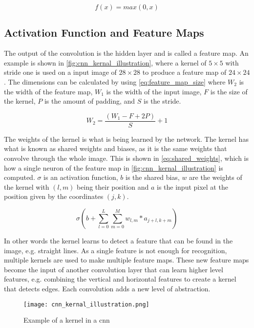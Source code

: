 \begin{equation}
\label{eq:ReluFunction}
f(x) = max(0,x)
\end{equation}

\subsection{Activation Function and Feature Maps}
The output of the convolution is the hidden layer and is called a feature map. An example is shown in \autoref{fig:cnn_kernal_illustration}, where a kernel of $5\times5$ with stride one is used on a input image of $28\times28$ to produce a feature map of $24\times24$. The dimensions can be calculated by using \autoref{eq:feature_map_size}  where $W_2$ is the width of the feature map, $W_1$ is the width of the input image, $F$ is the size of the kernel, $P$ is the amount of padding, and $S$ is the stride.  

\begin{equation}
\label{eq:feature_map_size}
W_2 = \frac{(W_1-F+2P)}{S} +1
\end{equation}

The weights of the kernel is what is being learned by the network. The kernel has what is known as shared weights and biases, as it is the same weights that convolve through the whole image. This is shown in \autoref{eq:shared_weights}, which is how a single neuron of the feature map in \autoref{fig:cnn_kernal_illustration} is computed. $\sigma$ is an activation function, $b$ is the shared bias,  $w$ are the weights of the kernel with $(l,m)$ being their position and $a$ is the input pixel at the position given by the coordinates $(j,k)$.

\begin{equation}
\label{eq:shared_weights}
\sigma(b+\sum\limits_{l=0}^L \sum\limits_{m=0}^M w_{l,m}*a_{j+l,k+m})
\end{equation}


In other words the kernel learns to detect a feature that can be found in the image, e.g. straight lines. As a single feature is not enough for recognition, multiple kernels are used to make multiple feature maps. These new feature maps become the input of another convolution layer that can learn higher level features, e.g. combining the vertical and horizontal features to create a kernel that detects edges. Each convolution adds a new level of abstraction.

\begin{figure}[h]
\centering
\texttt{[image: cnn\_kernal\_illustration.png]}
\caption{Example of a kernel in a \gls{cnn} \citep{Nielsen2015}}
\label{fig:cnn_kernal_illustration}
\end{figure}

